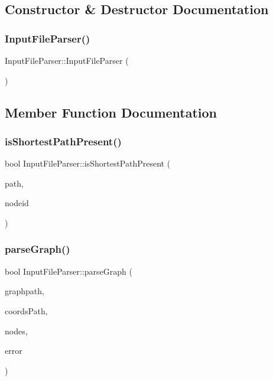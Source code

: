 \subsection{Constructor \& Destructor Documentation}
\mbox{\label{class_input_file_parser_a7235f2dc37c08ecc5b8ffbd7a9c38b63}} 
\subsubsection{\texorpdfstring{InputFileParser()}{InputFileParser()}}
{\footnotesize\ttfamily Input\+File\+Parser\+::\+Input\+File\+Parser (\begin{DoxyParamCaption}{ }\end{DoxyParamCaption})}



\subsection{Member Function Documentation}
\mbox{\label{class_input_file_parser_a05314529d0ec1dcea25c5bc558438845}} 
\subsubsection{\texorpdfstring{isShortestPathPresent()}{isShortestPathPresent()}}
{\footnotesize\ttfamily bool Input\+File\+Parser\+::is\+Shortest\+Path\+Present (\begin{DoxyParamCaption}\item[{const Q\+String \&}]{path,  }\item[{\mbox{\hyperlink{classtypes_1_1_node_id}{types\+::\+Node\+Id}}}]{nodeid }\end{DoxyParamCaption})}

\mbox{\label{class_input_file_parser_a4ba538032394832a80a3b837b3c8ba9a}} 
\subsubsection{\texorpdfstring{parseGraph()}{parseGraph()}}
{\footnotesize\ttfamily bool Input\+File\+Parser\+::parse\+Graph (\begin{DoxyParamCaption}\item[{const Q\+String \&}]{graphpath,  }\item[{const Q\+String \&}]{coords\+Path,  }\item[{Q\+List$<$ \mbox{\hyperlink{class_graph_builder_1_1_node}{Graph\+Builder\+::\+Node}} $>$ \&}]{nodes,  }\item[{Q\+String $\ast$}]{error }\end{DoxyParamCaption})}

